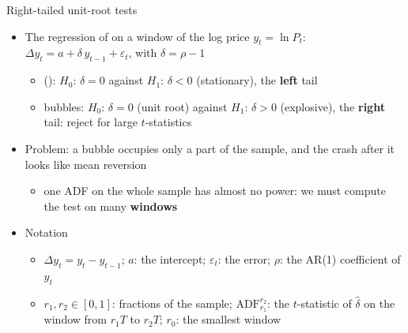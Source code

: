 \begin{frame}{Right-tailed unit-root tests}
\itemsize{\footnotesize}
\begin{itemize}
    \item The regression of  on a window of the log price $y_t = \ln P_t$: $\Delta y_t = a + \delta\, y_{t-1} + \varepsilon_t$, with $\delta = \rho - 1$
    \begin{itemize}
        \item {} (): $H_0$: $\delta = 0$ against $H_1$: $\delta < 0$ (stationary), the \textbf{left} tail
        \item bubbles: $H_0$: $\delta = 0$ (unit root) against $H_1$: $\delta > 0$ (explosive), the \textbf{right} tail: reject for large $t$-statistics
    \end{itemize}
    \item Problem: a bubble occupies only a part of the sample, and the crash after it looks like mean reversion
    \begin{itemize}
        \item one ADF on the whole sample has almost no power: we must compute the test on many \textbf{windows}
    \end{itemize}
    \item Notation
    \begin{itemize}
        \item $\Delta y_t = y_t - y_{t-1}$; $a$: the intercept; $\varepsilon_t$: the error; $\rho$: the AR(1) coefficient of $y_t$
        \item $r_1, r_2 \in [0,1]$: fractions of the sample; $\mathrm{ADF}_{r_1}^{r_2}$: the $t$-statistic of $\hat\delta$ on the window from $r_1T$ to $r_2T$; $r_0$: the smallest window
    \end{itemize}
\end{itemize}
\end{frame}

